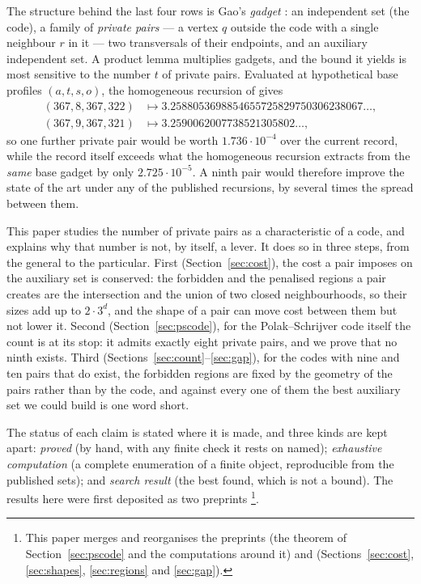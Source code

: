 The structure behind the last four rows is Gao's \emph{gadget} \cite{gao2026}: an independent set
(the code), a family of \emph{private pairs} --- a vertex $q$ outside the code with a single
neighbour $r$ in it --- two transversals of their endpoints, and an auxiliary independent set.
A product lemma multiplies gadgets, and the bound it yields is most sensitive to the number $t$
of private pairs. Evaluated at hypothetical base profiles $(a,t,s,o)$, the homogeneous recursion
of \cite{gao2026,bpz2026} gives
\begin{align*}
(367,8,367,322)&\mapsto 3.2588053698854655725829750306238067\ldots,\\
(367,9,367,321)&\mapsto 3.2590062007738521305802\ldots,
\end{align*}
so one further private pair would be worth $1.736\cdot 10^{-4}$ over the current record, while
the record itself \cite{tandon2026} exceeds what the homogeneous recursion extracts from the
\emph{same} base gadget by only $2.725\cdot10^{-5}$. A ninth pair would therefore improve the
state of the art under any of the published recursions, by several times the spread between
them.

This paper studies the number of private pairs as a characteristic of a code, and explains why
that number is not, by itself, a lever. It does so in three steps, from the general to the
particular. First (Section~\ref{sec:cost}), the cost a pair imposes on the auxiliary set is
conserved: the forbidden and the penalised regions a pair creates are the intersection and the
union of two closed neighbourhoods, so their sizes add up to $2\cdot 3^d$, and the shape of a
pair can move cost between them but not lower it. Second (Section~\ref{sec:pscode}), for the
Polak--Schrijver code itself the count is at its stop: it admits exactly eight private pairs, and
we prove that no ninth exists. Third (Sections~\ref{sec:count}--\ref{sec:gap}), for the codes
with nine and ten pairs that do exist, the forbidden regions are fixed by the geometry of the pairs
rather than by the code, and against every one of them the best auxiliary set we could build is
one word short.

The status of each claim is stated where it is made, and three kinds are kept apart: \emph{proved}
(by hand, with any finite check it rests on named); \emph{exhaustive computation} (a complete
enumeration of a finite object, reproducible from the published sets); and \emph{search result}
(the best found, which is not a bound). The results here were first deposited as two preprints
\cite{oktiabrev2026a,oktiabrev2026b}\footnote{This paper merges and reorganises the preprints
\cite{oktiabrev2026a} (the theorem of Section~\ref{sec:pscode} and the computations around it) and
\cite{oktiabrev2026b} (Sections~\ref{sec:cost}, \ref{sec:shapes}, \ref{sec:regions} and
\ref{sec:gap}).}.

